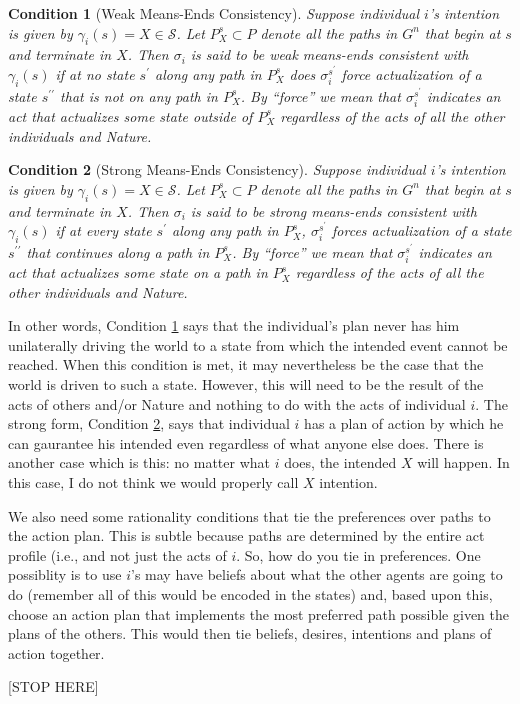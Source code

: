 \documentclass[
11pt,
titlepage,
reqno,
]{article}%
\newtheorem{condition}{Condition}
\theoremstyle{definition}
\begin{document}
	\begin{condition}[Weak Means-Ends Consistency]\label{cond:weak M-E}
		Suppose individual $i$'s intention is given by $\gamma_i(s)=X\in\mathcal{S}$. 
		Let $P^s_X\subset P$ denote all the paths in $G^n$ that begin at $s$ and terminate in $X$. 
		Then $\sigma_i$ is said to be \textit{weak means-ends consistent with $\gamma_i(s)$} if at no state $s^\prime$ along any path in $P^s_X$ does $\sigma_i^{s^\prime}$ force actualization of a state $s^{\prime\prime}$ that is not on any path in $P^s_X$. 
		By ``force'' we mean that $\sigma_i^{s^\prime}$ indicates an act that actualizes some state outside of $P^s_X$ regardless of the acts of all the other individuals and Nature. 
	\end{condition}
	
	\begin{condition}[Strong Means-Ends Consistency]\label{cond:strong M-E}
		Suppose individual $i$'s intention is given by $\gamma_i(s)=X\in\mathcal{S}$. 
		Let $P^s_X\subset P$ denote all the paths in $G^n$ that begin at $s$ and terminate in $X$. 
		Then $\sigma_i$ is said to be \textit{strong means-ends consistent with $\gamma_i(s)$} if at every state $s^\prime$ along any path in $P^s_X$,  $\sigma_i^{s^\prime}$ forces actualization of a state $s^{\prime\prime}$ that continues along a path in $P^s_X$. 
		By ``force'' we mean that $\sigma_i^{s^\prime}$ indicates an act that actualizes some state on a path in $P^s_X$ regardless of the acts of all the other individuals and Nature. 
	\end{condition}
	
	In other words, Condition \ref{cond:weak M-E} says that the individual's plan never has him unilaterally driving the world to a state from which the intended event cannot be reached. 
	When this condition is met, it may nevertheless be the case that the world is driven to such a state. 
	However, this will need to be the result of the acts of others and/or Nature and nothing to do with the acts of individual $i$. 
	The strong form, Condition \ref{cond:strong M-E}, says that individual $i$ has a plan of action by which he can gaurantee his intended even regardless of what anyone else does.
	There is another case which is this: no matter what $i$ does, the intended $X$ will happen. 
	In this case, I do not think we would properly call $X$ intention. 
	
	We also need some rationality conditions that tie the preferences over paths to the action plan. 
	This is subtle because paths are determined by the entire act profile (i.e., and not just the acts of $i$. 
	So, how do you tie in preferences. One possiblity is to use $i$'s may have beliefs about what the other agents are going to do (remember all of this would be encoded in the states) and, based upon this, choose an action plan that implements the most preferred path possible given the plans of the others. 
	This would then tie beliefs, desires, intentions and plans of action together. 
	
	
	[STOP HERE]
	
	
	
	
\end{document}
